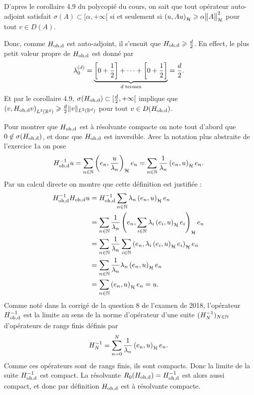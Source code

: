 D'apres le corollaire 4.9 du polycopié du cours, on sait
que tout opérateur auto-adjoint satisfait
$\sigma(A) \subset [\alpha, +\infty[$ si et seulement si
$\left( u, Au \right)_{\mathcal{H}} \geqslant \alpha \big\| A \big\|_{\mathcal{H}}^2$ pour tout $v \in D(A)$.

Donc, comme $H_\text{oh,d}$ est auto-adjoint, il s'ensuit que
$H_\text{oh,d} \geqslant \frac{d}{2}$. En
effect, le plus petit valeur propre de $H_\text{oh,d}$ est donné par
\begin{align}
    \lambda_0^{(d)} = \underbrace{ \left[ 0 + \frac{1}{2} \right] + \cdots
    + \left[ 0 + \frac{1}{2} \right] }_{d \text{ termes}} = \frac{d}{2}.
\end{align}
%
Et par le corollaire 4.9,
$\sigma(H_\text{oh,d}) \subset [\frac{d}{2}, +\infty [$ implique que
$\left( v, H_\text{oh,d} v \right)_{L^2(\mathbb{R}^d)} \geqslant \frac{d}{2} \| v \|_{L^2(\mathbb{R}^d)}$ pour
tout $v \in D(H_\text{oh,d})$.

Pour montrer que $H_\text{oh,d}$ est à résolvante compacte on note
tout d'abord que $0 \not\in \sigma(H_\text{oh,d})$, et donc que $H_\text{oh,d}$
est inversible. Avec la notation plus abstraite de l'exercice
1a on pose
\begin{align}
    H_\text{oh,d}^{-1} u = \sum_{{n \in \mathbb{N}}} \left( e_n, \frac{u}{\lambda_n} \right)_{\mathcal{H}} e_n
    = \sum_{{n \in \mathbb{N}}} \frac{1}{\lambda_n} \left( e_n, u \right)_{\mathcal{H}} e_n.
\end{align}
%
Par un calcul directe on montre que cette définition est justifiée :
\begin{align}
    \hodi \hod u &= \hod^{-1} \sum_{\inn{n}} \lambda_n \psh{e_n}{u} e_n \\
    &= \sum_{\inn{n}} \frac{1}{\lambda_n} \psh{e_n}{
        \sum_{\inn{i}} \lambda_i \psh{e_i}{u} e_i} e_n \\
%
    &= \sum_{\inn{n}} \frac{1}{\lambda_n} \sum_{\inn{i}}  \psh{e_n}{
        \lambda_i \psh{e_i}{u} e_i} e_n \\
%
    &= \sum_{\inn{n}} \frac{1}{\lambda_n}
    \lambda_n \psh{e_n}{u} e_n \\
%
    &= \sum_{\inn{n}} \psh{e_n}{u} e_n = u.
\end{align}
%
Comme noté dans la corrigé de la question 8 de l'examen de 2018,
l'opérateur $H_\text{oh,d}^{-1}$ est la limite au sens de la norme
d'opérateur d'une suite $(H_N^{-1})_{N \in \mathbb{N}}$ d'opérateurs
de rangs finis définis par
\begin{align}
    H_N^{-1} = \sum_{n = 0}^N \frac{1}{\lambda_n} \left( e_n, u \right)_{\mathcal{H}} e_n.
\end{align}
Comme ces opérateurs sont de rangs finis, ils sont compacts.
Donc la limite de la suite $H_\text{oh,d}^{-1}$ est compact.
La résolvante $R_0(H_\text{oh,d}) = H_\text{oh,d}^{-1}$ est alors aussi compact, et donc
par définition $H_\text{oh,d}$ est à résolvante compacte.

